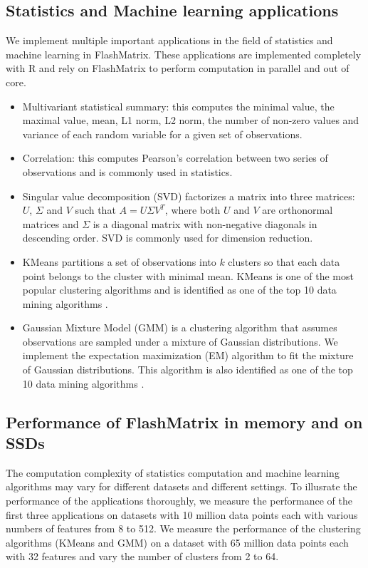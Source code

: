 \subsection{Statistics and Machine learning applications} \label{sec:apps}
We implement multiple important applications in the field of statistics and
machine learning in FlashMatrix. These applications are implemented completely
with R and rely on FlashMatrix to perform computation in parallel and out of
core.
\begin{itemize}
	\item Multivariant statistical summary: this computes the minimal value,
		the maximal value, mean, L1 norm, L2 norm, the number of non-zero values
		and variance of each random variable for a given set of observations.
	\item Correlation: this computes Pearson's correlation \cite{} between
		two series of observations and is commonly used in statistics.
	\item Singular value decomposition (SVD) \cite{} factorizes a matrix into
		three matrices: $U$, $\Sigma$ and $V$ such that $A=U \Sigma V^T$, where
		both $U$ and $V$ are orthonormal matrices and $\Sigma$ is a diagonal
		matrix with non-negative diagonals in descending order. SVD is commonly
		used for dimension reduction.
	\item KMeans \cite{kmeans} partitions a set of observations into $k$ clusters
		so that each data point belongs to the cluster with minimal mean. KMeans
		is one of the most popular clustering algorithms and is identified as
		one of the top 10 data mining algorithms \cite{top10}.
	\item Gaussian Mixture Model (GMM) \cite{gmm} is a clustering algorithm that
		assumes observations are sampled under a mixture of Gaussian distributions.
		We implement the expectation maximization (EM) \cite{em} algorithm to fit
		the mixture of Gaussian distributions. This algorithm is also identified
		as one of the top 10 data mining algorithms \cite{top10}.
\end{itemize}


\subsection{Performance of FlashMatrix in memory and on SSDs}

The computation complexity of statistics computation and machine learning
algorithms may vary for different datasets and different settings. To illusrate
the performance of the applications thoroughly, we measure the performance
of the first three applications on datasets with 10 million data points each
with various numbers of features from 8 to 512. We measure the performance of
the clustering algorithms (KMeans and GMM) on a dataset with 65 million data
points each with 32 features and vary the number of clusters from 2 to 64.

